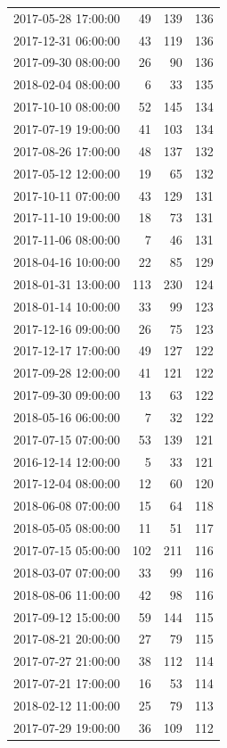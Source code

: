 \begin{tabular}{lrrr}
2017-05-28 17:00:00 & 49 & 139 & 136 \\
2017-12-31 06:00:00 & 43 & 119 & 136 \\
2017-09-30 08:00:00 & 26 & 90 & 136 \\
2018-02-04 08:00:00 & 6 & 33 & 135 \\
2017-10-10 08:00:00 & 52 & 145 & 134 \\
2017-07-19 19:00:00 & 41 & 103 & 134 \\
2017-08-26 17:00:00 & 48 & 137 & 132 \\
2017-05-12 12:00:00 & 19 & 65 & 132 \\
2017-10-11 07:00:00 & 43 & 129 & 131 \\
2017-11-10 19:00:00 & 18 & 73 & 131 \\
2017-11-06 08:00:00 & 7 & 46 & 131 \\
2018-04-16 10:00:00 & 22 & 85 & 129 \\
2018-01-31 13:00:00 & 113 & 230 & 124 \\
2018-01-14 10:00:00 & 33 & 99 & 123 \\
2017-12-16 09:00:00 & 26 & 75 & 123 \\
2017-12-17 17:00:00 & 49 & 127 & 122 \\
2017-09-28 12:00:00 & 41 & 121 & 122 \\
2017-09-30 09:00:00 & 13 & 63 & 122 \\
2018-05-16 06:00:00 & 7 & 32 & 122 \\
2017-07-15 07:00:00 & 53 & 139 & 121 \\
2016-12-14 12:00:00 & 5 & 33 & 121 \\
2017-12-04 08:00:00 & 12 & 60 & 120 \\
2018-06-08 07:00:00 & 15 & 64 & 118 \\
2018-05-05 08:00:00 & 11 & 51 & 117 \\
2017-07-15 05:00:00 & 102 & 211 & 116 \\
2018-03-07 07:00:00 & 33 & 99 & 116 \\
2018-08-06 11:00:00 & 42 & 98 & 116 \\
2017-09-12 15:00:00 & 59 & 144 & 115 \\
2017-08-21 20:00:00 & 27 & 79 & 115 \\
2017-07-27 21:00:00 & 38 & 112 & 114 \\
2017-07-21 17:00:00 & 16 & 53 & 114 \\
2018-02-12 11:00:00 & 25 & 79 & 113 \\
2017-07-29 19:00:00 & 36 & 109 & 112 \\

\end{tabular}
